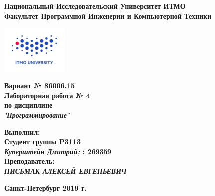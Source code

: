 \documentclass[11pt,a4paper]{article}
\begin{document}
	\thispagestyle{empty}
	\begin{center}
		\textbf{Национальный Исследовательский Университет ИТМО}\\
		\textbf{Факультет Программной Инженерии и Компьютерной Техники}\\
	\end{center}
	\vspace{2em}
	\begin{center}
		\includegraphics[width=120px]{../../../itmo-logo.png}
	\end{center}
	\LARGE
	\vspace{5em}
	\begin{center}
		\textbf{Вариант № 86006.15}\\
		\textbf{Лабораторная работа № 4}\\
		\Large
		\textbf{по дисциплине}\\
		\LARGE
		\textbf{\emph{'Программирование'}}\\
	\end{center}
	\vspace{11em}
	\large
	\begin{flushright}
		\textbf{Выполнил:}\\
		\textbf{Студент группы P3113}\\
		\textbf{\emph{Куперштейн Дмитрий;} : 269359}\\
		\textbf{Преподаватель:}\\
		\textbf{\emph{ПИСЬМАК АЛЕКСЕЙ ЕВГЕНЬЕВИЧ}}\\
	\end{flushright}
	\vspace{4em}
	\large
	\begin{center}
		\textbf{Санкт-Петербург 2019 г.}
	\end{center}
	\pagebreak{}
	\tableofcontents
	\pagebreak
\end{document}
